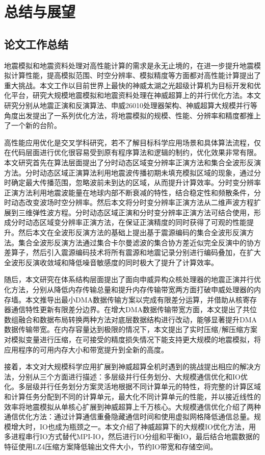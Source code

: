 \chapter{总结与展望} %
\label{ch:总结与展望}

\section{论文工作总结}

地震模拟和地震资料处理对高性能计算的需求是永无止境的，在进一步提升地震模拟计算性能，提高模拟范围、时空分辨率、模拟精度等方面都对高性能计算提出了重大挑战。本文工作以目前世界上最快的神威太湖之光超级计算机为目标开发和优化平台，研究大规模地震模拟和地震资料处理在神威超算上的并行优化方法。本文研究分别从地震正演和反演算法、申威26010处理器架构、神威超算大规模并行等角度出发提出了一系列优化方法，将地震模拟的规模、性能、分辨率和精度都推上了一个新的台阶。

高性能应用优化是交叉学科研究，若不了解目标科学应用场景和具体算法流程，仅在代码层面进行优化很容易受到原有程序算法和逻辑的制约，优化效果非常有限。本文研究首先在算法层面提出了分时动态区域变分辨率正演方法和集合全波形反演方法。分时动态区域正演算法利用地震波传播初期未填充模拟区域的现象，通过分时确定最大传播范围，忽略波前未到达的区域，从而提升计算效率。分时变分辨率正演方法利用地震波能量在地球内部不断衰减的特性，结合稳定性和频散条件，分时动态改变波场时空分辨率。然后本文将分时变分辨率正演方法从二维声波方程扩展到三维弹性波方程。分时动态区域正演和分时变分辨率正演方法可结合使用，形成分时动态区域变分辨率正演方法，在保证正演精度的同时获得了可观的性能提升。然后本文在全波形反演方法的基础上提出基于震源编码的集合全波形反演方法。集合全波形反演方法通过集合卡尔曼滤波的集合协方差近似完全反演中的协方差算子，然后引入震源编码技术将所有震源和地震记录分别进行编码叠加，在扩大全波形反演收敛域和降低噪音敏感度的同时极大了提升了计算效率。

随后，本文研究在体系结构层面提出了面向申威异构众核处理器的地震正演并行优化方法，分别从降低内存传输总量和提升内存传输带宽两方面打破申威处理器的内存墙。本文推导出最小DMA数据传输方案以完成有限差分运算，并借助从核寄存器通信特性更新有限差分边界。在增大DMA数据传输带宽方面，本文提出了共位数组融合和数据布局转换两种方法对底层数据结构进行改动，能够显著提升DMA数据传输带宽。在内存容量达到极限的情况下，本文提出了实时压缩/解压缩方案对模拟变量进行压缩，在可接受的精度损失情况下能支持更大规模的地震模拟，将应用程序的可用内存大小和带宽提升到全新的高度。

接着，本文对大规模科学应用扩展到神威超算全机时遇到的挑战提出相应的解决方法，分别从三个方面进行描述：多层级并行任务划分、大规模通信优化和IO优化。多层级并行任务划分方案灵活地根据不同计算单元的特性，将完整的计算区域和计算任务分配到不同的计算单元，最大化不同计算单元的性能，并以接近线性的效率将地震模拟从单核心扩展到神威超算上千万核心。大规模通信优化介绍了两种通信优化方法：通过计算通信重叠隐藏通信时间和使用虚拟网格降低通信总量。规模增大时，IO也成为瓶颈之一。本文介绍了神威超算下的大规模IO优化方法，用多进程串行IO方式替代MPI-IO，然后进行IO分组和平衡IO，最后结合地震数据的特征使用LZ4压缩方案降低输出文件大小，节约IO带宽和存储空间。

